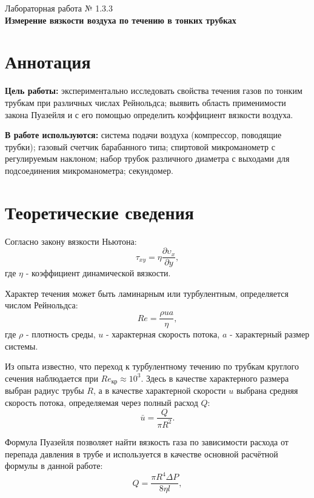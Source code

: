 \documentclass[a4paper,12pt]{article} %
\begin{document}
\begin{center}   
	\large{Лабораторная работа № 1.3.3\\\textbf{Измерение вязкости воздуха по течению в тонких трубках}}\\
\end{center}

\section{Аннотация}

\noindent\textbf{Цель работы:}
экспериментально исследовать свойства течения газов по тонким трубкам при различных числах Рейнольдса; выявить область применимости закона Пуазейля и с его помощью определить коэффициент вязкости воздуха.\hfill
	
\bigskip
\noindent\textbf{В работе используются:}
система подачи воздуха (компрессор, поводящие трубки); газовый счетчик барабанного типа; спиртовой микроманометр с регулируемым наклоном; набор трубок различного диаметра с выходами для подсоединения микроманометра; секундомер.

\section{Теоретические сведения}

Согласно закону вязкости Ньютона:
$$\tau_{xy} = \eta \frac{\partial \upsilon_x}{\partial y},$$
где $\eta$ - коэффициент динамической вязкости.

Характер течения может быть ламинарным или турбулентным, определяется числом Рейнольдса:
\begin{equation}
Re = \frac{\rho u a}{\eta},
\end{equation} 
где $\rho$ - плотность среды, $u$ - характерная скорость потока, $a$ - характерный размер системы.

Из опыта известно, что переход к турбулентному течению по трубкам круглого сечения наблюдается при $Re_{кр} \approx 10^3$. Здесь в качестве характерного размера выбран радиус трубы $R$, а в качестве характерной скорости $u$ выбрана
средняя скорость потока, определяемая через полный расход $Q$:
\begin{equation}
\bar{u} = \frac{Q}{\pi R^2}.
\end{equation}

Формула Пуазейля позволяет найти вязкость газа по зависимости расхода от перепада
давления в трубе и используется в качестве основной расчётной формулы в данной работе:
\begin{equation}
Q = \frac{\pi R^4\Delta P}{8\eta l},
\end{equation}
\end{document}
